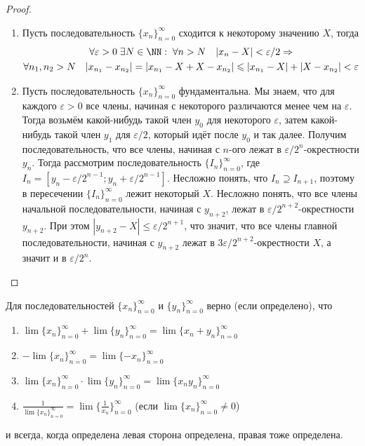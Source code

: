 \documentclass[12pt,a4paper]{article}
\begin{document}
    \begin{proof}
        \begin{enumerate}
            \item Пусть последовательность $\{x_n\}_{n=0}^\infty$ сходится к некоторому значению $X$, тогда
                \begin{multline*}
                    \forall \varepsilon > 0\; \exists N \in \NN:\; \forall n > N\quad |x_n - X| < \varepsilon/2 \Rightarrow\\
                    \forall n_1, n_2 > N\quad |x_{n_1} - x_{n_2}| = |x_{n_1} - X + X - x_{n_2}| \leqslant |x_{n_1} - X| + |X - x_{n_2}| < \varepsilon
                \end{multline*}
            \item Пусть последовательность $\{x_n\}_{n=0}^\infty$ фундаментальна. Мы знаем, что для каждого $\varepsilon > 0$ все члены, начиная с некоторого различаются менее чем на $\varepsilon$. Тогда возьмём какой-нибудь такой член $y_0$ для некоторого $\varepsilon$, затем какой-нибудь такой член $y_1$ для $\varepsilon/2$, который идёт после $y_0$ и так далее. Получим последовательность, что все члены, начиная с $n$-ого лежат в $\varepsilon/2^n$-окрестности $y_n$. Тогда рассмотрим последовательность $\{I_n\}_{n=0}^\infty$, где $I_n = [y_n - \varepsilon/2^{n-1}; y_n + \varepsilon/2^{n-1}]$. Несложно понять, что $I_n \supseteq I_{n+1}$, поэтому в пересечении $\{I_n\}_{n=0}^\infty$ лежит некоторый $X$. Несложно понять, что все члены начальной последовательности, начиная с $y_{n+2}$, лежат в $\varepsilon/2^{n+2}$-окрестности $y_{n+2}$. При этом $|y_{n+2} - X| \leqslant \varepsilon/2^{n+1}$, что значит, что все члены главной последовательности, начиная с $y_{n+2}$ лежат в $3\varepsilon/2^{n+2}$-окрестности $X$, а значит и в $\varepsilon/2^n$.
        \end{enumerate}
    \end{proof}

    \begin{statement}
        Для последовательностей $\{x_n\}_{n=0}^\infty$ и $\{y_n\}_{n=0}^\infty$ верно (если определено), что
        \begin{enumerate}
            \item $\lim \{x_n\}_{n=0}^\infty + \lim \{y_n\}_{n=0}^\infty = \lim \{x_n + y_n\}_{n=0}^\infty$
            \item $-\lim \{x_n\}_{n=0}^\infty = \lim \{-x_n\}_{n=0}^\infty$
            \item $\lim \{x_n\}_{n=0}^\infty \cdot \lim \{y_n\}_{n=0}^\infty = \lim \{x_n y_n\}_{n=0}^\infty$
            \item $\frac{1}{\lim \{x_n\}_{n=0}^\infty} = \lim \{\frac{1}{x_n}\}_{n=0}^\infty$ (если $\lim \{x_n\}_{n=0}^\infty \neq 0$)
        \end{enumerate}
        и всегда, когда определена левая сторона определена, правая тоже определена.
    \end{statement}
\end{document}
